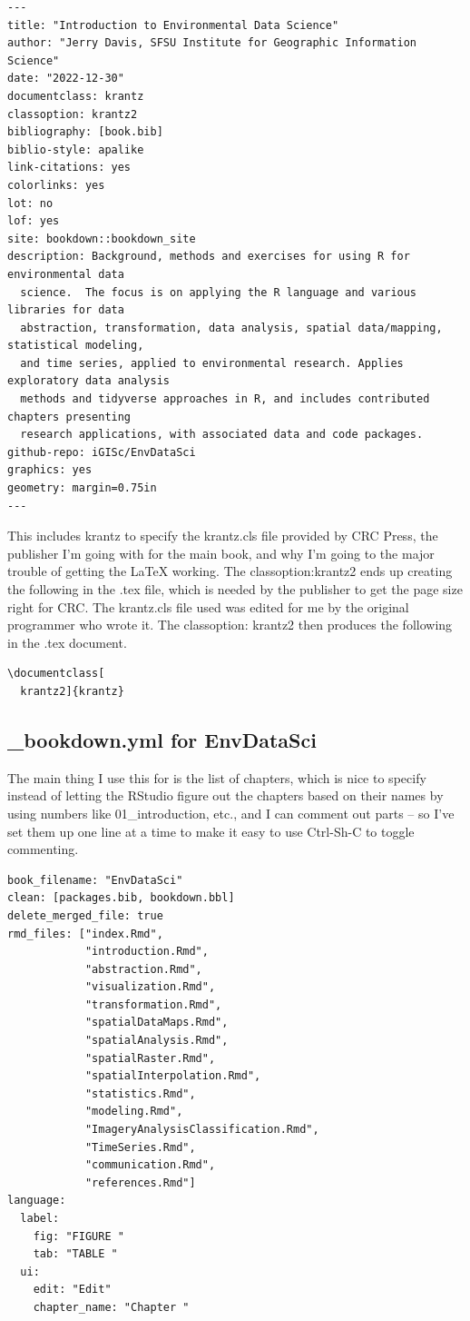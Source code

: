 \documentclass[
]{book}
\begin{document}
\begin{verbatim}
---
title: "Introduction to Environmental Data Science"
author: "Jerry Davis, SFSU Institute for Geographic Information Science"
date: "2022-12-30"
documentclass: krantz
classoption: krantz2
bibliography: [book.bib]
biblio-style: apalike
link-citations: yes
colorlinks: yes
lot: no
lof: yes
site: bookdown::bookdown_site
description: Background, methods and exercises for using R for environmental data
  science.  The focus is on applying the R language and various libraries for data
  abstraction, transformation, data analysis, spatial data/mapping, statistical modeling,
  and time series, applied to environmental research. Applies exploratory data analysis
  methods and tidyverse approaches in R, and includes contributed chapters presenting
  research applications, with associated data and code packages.
github-repo: iGISc/EnvDataSci
graphics: yes
geometry: margin=0.75in
---
\end{verbatim}

This includes krantz to specify the krantz.cls file provided by CRC Press, the publisher I'm going with for the main book, and why I'm going to the major trouble of getting the LaTeX working. The classoption:krantz2 ends up creating the following in the .tex file, which is needed by the publisher to get the page size right for CRC. The krantz.cls file used was edited for me by the original programmer who wrote it. The classoption: krantz2 then produces the following in the .tex document.

\begin{verbatim}
\documentclass[
  krantz2]{krantz}
\end{verbatim}

\hypertarget{bookdown.yml-for-envdatasci}{%
\subsection{\_bookdown.yml for EnvDataSci}\label{bookdown.yml-for-envdatasci}}

The main thing I use this for is the list of chapters, which is nice to specify instead of letting the RStudio figure out the chapters based on their names by using numbers like 01\_introduction, etc., and I can comment out parts -- so I've set them up one line at a time to make it easy to use Ctrl-Sh-C to toggle commenting.

\begin{verbatim}
book_filename: "EnvDataSci"
clean: [packages.bib, bookdown.bbl]
delete_merged_file: true
rmd_files: ["index.Rmd",
            "introduction.Rmd",
            "abstraction.Rmd",
            "visualization.Rmd",
            "transformation.Rmd",
            "spatialDataMaps.Rmd",
            "spatialAnalysis.Rmd",
            "spatialRaster.Rmd",
            "spatialInterpolation.Rmd",
            "statistics.Rmd",
            "modeling.Rmd",
            "ImageryAnalysisClassification.Rmd",
            "TimeSeries.Rmd",
            "communication.Rmd",
            "references.Rmd"]
language:
  label:
    fig: "FIGURE "
    tab: "TABLE "
  ui:
    edit: "Edit"
    chapter_name: "Chapter "
\end{verbatim}
\end{document}
